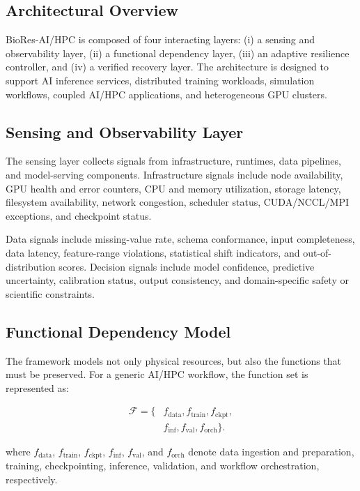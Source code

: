 \documentclass[conference]{IEEEtran}
\begin{document}
\subsection{Architectural Overview}

BioRes-AI/HPC is composed of four interacting layers: (i) a sensing and observability layer, (ii) a functional dependency layer, (iii) an adaptive resilience controller, and (iv) a verified recovery layer. The architecture is designed to support AI inference services, distributed training workloads, simulation workflows, coupled AI/HPC applications, and heterogeneous GPU clusters.

\subsection{Sensing and Observability Layer}

The sensing layer collects signals from infrastructure, runtimes, data pipelines, and model-serving components. Infrastructure signals include node availability, GPU health and error counters, CPU and memory utilization, storage latency, filesystem availability, network congestion, scheduler status, CUDA/NCCL/MPI exceptions, and checkpoint status.

Data signals include missing-value rate, schema conformance, input completeness, data latency, feature-range violations, statistical shift indicators, and out-of-distribution scores. Decision signals include model confidence, predictive uncertainty, calibration status, output consistency, and domain-specific safety or scientific constraints.

\subsection{Functional Dependency Model}

The framework models not only physical resources, but also the functions that must be preserved. For a generic AI/HPC workflow, the function set is represented as:

\begin{equation}
\begin{aligned}
\mathcal{F} = \{
& f_{\mathrm{data}},
f_{\mathrm{train}},
f_{\mathrm{ckpt}}, \\
& f_{\mathrm{inf}},
f_{\mathrm{val}},
f_{\mathrm{orch}}
\}.
\end{aligned}
\label{eq:function-set}
\end{equation}

where $f_{\mathrm{data}}$, $f_{\mathrm{train}}$,
$f_{\mathrm{ckpt}}$, $f_{\mathrm{inf}}$,
$f_{\mathrm{val}}$, and $f_{\mathrm{orch}}$ denote data ingestion and
preparation, training, checkpointing, inference, validation, and workflow
orchestration, respectively.
\end{document}
